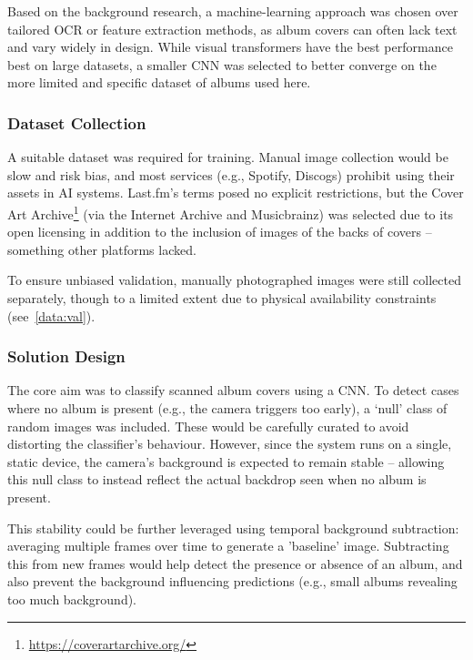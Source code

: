             Based on the background research, a machine-learning approach was chosen over tailored OCR or feature extraction methods, as album covers can often lack text and vary widely in design. While visual transformers have the best performance best on large datasets, a smaller CNN was selected to better converge on the more limited and specific dataset of albums used here.
        
            \subsubsection{Dataset Collection}
    
                A suitable dataset was required for training. Manual image collection would be slow and risk bias, and most services (e.g., Spotify, Discogs) prohibit using their assets in AI systems. Last.fm’s terms posed no explicit restrictions, but the Cover Art Archive\footnote{\url{https://coverartarchive.org/}} (via the Internet Archive and Musicbrainz) was selected due to its open licensing in addition to the inclusion of images of the backs of covers -- something other platforms lacked.
    
                To ensure unbiased validation, manually photographed images were still collected separately, though to a limited extent due to physical availability constraints (see~\ref{data:val}).
    
            \subsubsection{Solution Design}
    
                The core aim was to classify scanned album covers using a CNN. To detect cases where no album is present (e.g., the camera triggers too early), a ‘null’ class of random images was included. These would be carefully curated to avoid distorting the classifier’s behaviour. However, since the system runs on a single, static device, the camera’s background is expected to remain stable -- allowing this null class to instead reflect the actual backdrop seen when no album is present.
    
                This stability could be further leveraged using temporal background subtraction: averaging multiple frames over time to generate a 'baseline' image. Subtracting this from new frames would help detect the presence or absence of an album, and also prevent the background influencing predictions (e.g., small albums revealing too much background).
    
